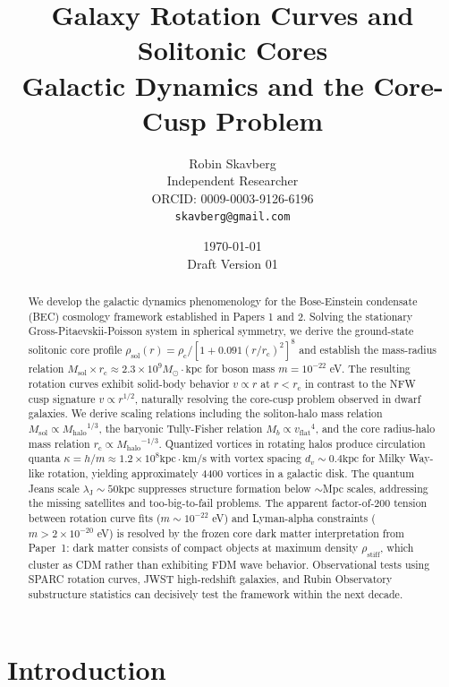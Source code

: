 \documentclass[11pt,a4paper]{article}
\title{\textbf{Galaxy Rotation Curves and Solitonic Cores}\\[0.5em]
\large Galactic Dynamics and the Core-Cusp Problem}
\author{Robin Skavberg\\[0.3em]
\small Independent Researcher\\
\small ORCID: 0009-0003-9126-6196\\
\small \texttt{skavberg@gmail.com}}
\date{\today\\[0.5em]
\small Draft Version 01}
\newcommand{\rhostiff}{\ensuremath{\rho_{\mathrm{stiff}}}}
\newcommand{\Msun}{\ensuremath{M_\odot}}
\newcommand{\Msol}{\ensuremath{M_{\mathrm{sol}}}}
\newcommand{\Mhalo}{\ensuremath{M_{\mathrm{halo}}}}
\newcommand{\kpc}{\ensuremath{\mathrm{kpc}}}
\newcommand{\rc}{\ensuremath{r_{\mathrm{c}}}}
\newcommand{\rhoc}{\ensuremath{\rho_{\mathrm{c}}}}
\newcommand{\vflat}{\ensuremath{v_{\mathrm{flat}}}}
\newcommand{\lambdaJ}{\ensuremath{\lambda_{\mathrm{J}}}}
\theoremstyle{definition}
\theoremstyle{remark}
\begin{document}
\maketitle

\begin{abstract}
We develop the galactic dynamics phenomenology for the Bose-Einstein condensate (BEC) cosmology framework established in Papers 1 and 2. Solving the stationary Gross-Pitaevskii-Poisson system in spherical symmetry, we derive the ground-state solitonic core profile $\rho_{\mathrm{sol}}(r) = \rhoc/[1 + 0.091(r/\rc)^2]^8$ and establish the mass-radius relation $\Msol \times \rc \approx 2.3 \times 10^9 \Msun \cdot \kpc$ for boson mass $m = 10^{-22}$ eV. The resulting rotation curves exhibit solid-body behavior $v \propto r$ at $r < \rc$ in contrast to the NFW cusp signature $v \propto r^{1/2}$, naturally resolving the core-cusp problem observed in dwarf galaxies. We derive scaling relations including the soliton-halo mass relation $\Msol \propto \Mhalo^{1/3}$, the baryonic Tully-Fisher relation $M_b \propto \vflat^4$, and the core radius-halo mass relation $\rc \propto \Mhalo^{-1/3}$. Quantized vortices in rotating halos produce circulation quanta $\kappa = h/m \approx 1.2 \times 10^8 \kpc \cdot \text{km/s}$ with vortex spacing $d_v \sim 0.4 \kpc$ for Milky Way-like rotation, yielding approximately 4400 vortices in a galactic disk. The quantum Jeans scale $\lambdaJ \sim 50 \kpc$ suppresses structure formation below $\sim$Mpc scales, addressing the missing satellites and too-big-to-fail problems. The apparent factor-of-200 tension between rotation curve fits ($m \sim 10^{-22}$ eV) and Lyman-alpha constraints ($m > 2 \times 10^{-20}$ eV) is resolved by the frozen core dark matter interpretation from Paper~1: dark matter consists of compact objects at maximum density $\rhostiff$, which cluster as CDM rather than exhibiting FDM wave behavior. Observational tests using SPARC rotation curves, JWST high-redshift galaxies, and Rubin Observatory substructure statistics can decisively test the framework within the next decade.
\end{abstract}

\tableofcontents
\newpage

\section{Introduction}
\label{sec:introduction}
\end{document}
